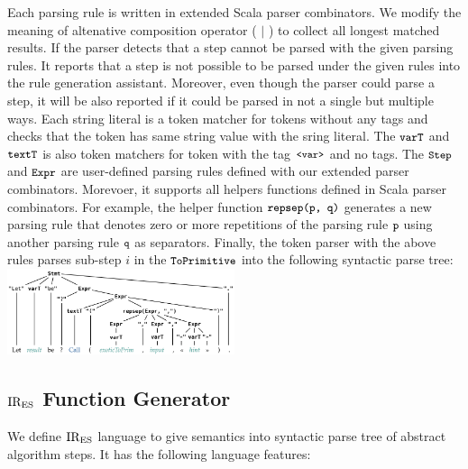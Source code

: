 Each parsing rule is written in extended Scala parser combinators.
We modify the meaning of altenative composition operator ( \( | \) ) to collect
all longest matched results. If the parser detects that a step cannot be
parsed with the given parsing rules. It reports that a step is not possible
to be parsed under the given rules into the rule generation assistant.
Moreover, even though the parser could parse a step, it will be also reported
if it could be parsed in not a single but multiple ways.
Each string literal is a token matcher for tokens without any tags and checks
that the token has same string value with the sring literal.
The \( \texttt{\small varT} \) and \( \texttt{\small textT} \) is also token matchers
for token with the tag \( \texttt{\small<var>} \) and no tags.
The \( \texttt{\small Step} \) and \( \texttt{\small Expr} \) are user-defined parsing rules
defined with our extended parser combinators.
Morevoer, it supports all helpers functions defined in Scala parser combinators.
For example, the helper function \( \texttt{\small repsep(p, q)} \) generates a new
parsing rule that denotes zero or more repetitions of the parsing rule \( \texttt{\small p} \)
using another parsing rule \( \texttt{\small q} \) as separators.
Finally, the token parser with the above rules parses sub-step \( i \) in the
\( \texttt{\small ToPrimitive} \) into the following syntactic parse tree:
\includegraphics[width=0.5\textwidth]{img/parse_tree.png}

\subsection{\( \text{IR}_\text{ES} \) Function Generator}

We define \( \text{IR}_\text{ES} \) language to give semantics into syntactic parse tree of
abstract algorithm steps. It has the following language features:

